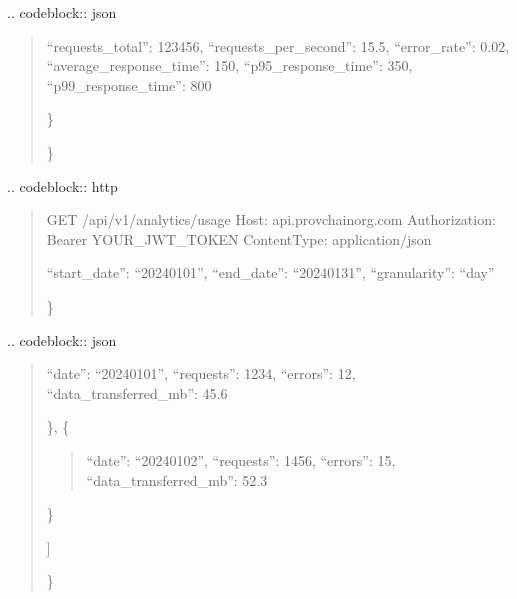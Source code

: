 \documentclass[letterpaper,10pt,english]{sphinxmanual}
\begin{document}
\sphinxAtStartPar
{}
.. code\sphinxhyphen{}block:: json
\begin{quote}
\begin{description}
\sphinxlineitem{\{}\begin{description}
\sphinxAtStartPar
“requests\_total”: 123456,
“requests\_per\_second”: 15.5,
“error\_rate”: 0.02,
“average\_response\_time”: 150,
“p95\_response\_time”: 350,
“p99\_response\_time”: 800

\end{description}

\sphinxAtStartPar
\}

\end{description}

\sphinxAtStartPar
\}
\end{quote}

\sphinxAtStartPar
{}
.. code\sphinxhyphen{}block:: http
\begin{quote}

\sphinxAtStartPar
GET /api/v1/analytics/usage
Host: api.provchain\sphinxhyphen{}org.com
Authorization: Bearer YOUR\_JWT\_TOKEN
Content\sphinxhyphen{}Type: application/json
\begin{description}
\sphinxlineitem{\{}
\sphinxAtStartPar
“start\_date”: “2024\sphinxhyphen{}01\sphinxhyphen{}01”,
“end\_date”: “2024\sphinxhyphen{}01\sphinxhyphen{}31”,
“granularity”: “day”

\end{description}

\sphinxAtStartPar
\}
\end{quote}

\sphinxAtStartPar
{}
.. code\sphinxhyphen{}block:: json
\begin{quote}
\begin{description}
\sphinxlineitem{\{}\begin{description}
\sphinxlineitem{“usage”: {[}}\begin{description}
\sphinxlineitem{\{}
\sphinxAtStartPar
“date”: “2024\sphinxhyphen{}01\sphinxhyphen{}01”,
“requests”: 1234,
“errors”: 12,
“data\_transferred\_mb”: 45.6

\end{description}

\sphinxAtStartPar
\},
\{
\begin{quote}

\sphinxAtStartPar
“date”: “2024\sphinxhyphen{}01\sphinxhyphen{}02”,
“requests”: 1456,
“errors”: 15,
“data\_transferred\_mb”: 52.3
\end{quote}

\sphinxAtStartPar
\}

\end{description}

\sphinxAtStartPar
{]}

\end{description}

\sphinxAtStartPar
\}
\end{quote}
\end{document}
